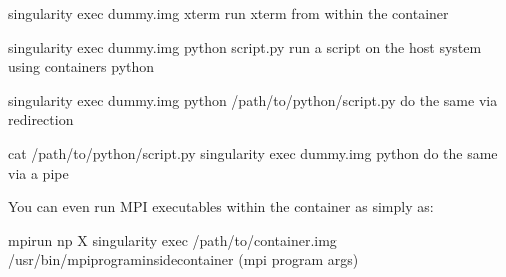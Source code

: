 \documentclass[letterpaper,10pt,english]{sphinxmanual}
\begin{document}
%
\begin{sphinxVerbatim}[commandchars=\\\{\}]
\PYGZdl{} singularity exec dummy.img xterm  \PYGZsh{} run xterm from within the container

\PYGZdl{} singularity exec dummy.img python script.py  \PYGZsh{} run a script on the host system using container\PYGZsq{}s python

\PYGZdl{} singularity exec dummy.img python \PYGZlt{} /path/to/python/script.py  \PYGZsh{} do the same via redirection

\PYGZdl{} cat /path/to/python/script.py \textbar{} singularity exec dummy.img python  \PYGZsh{} do the same via a pipe
\end{sphinxVerbatim}

You can even run MPI executables within the container as simply as:

%
\begin{sphinxVerbatim}[commandchars=\\\{\}]
\PYGZdl{} mpirun \PYGZhy{}np X singularity exec /path/to/container.img /usr/bin/mpi\PYGZus{}program\PYGZus{}inside\PYGZus{}container (mpi program args)
\end{sphinxVerbatim}
\end{document}
